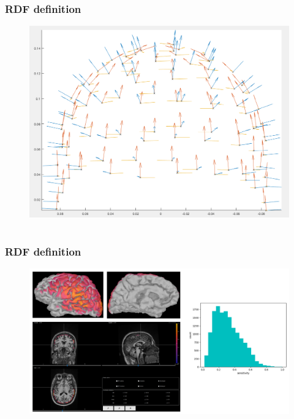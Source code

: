 \documentclass{beamer}
\numberwithin{figure}{section}
\numberwithin{equation}{section}
\begin{document}
\section{}
\begin{frame}
 \frametitle{RDF definition}
	\begin{figure}[p]
  		\centering
  		\includegraphics[width=0.6\linewidth]{pictures/opmvect}
  		\label{fig:approaches_RDF}
 	\end{figure}

  
\end{frame}
\section{}
\begin{frame}
 \frametitle{RDF definition}
	\begin{figure}[p]
  		\centering
  		\includegraphics[width=1\linewidth]{pictures/opmsen00}
  		\label{fig:approaches_RDF}
 	\end{figure}

  
\end{frame}
\end{document}
